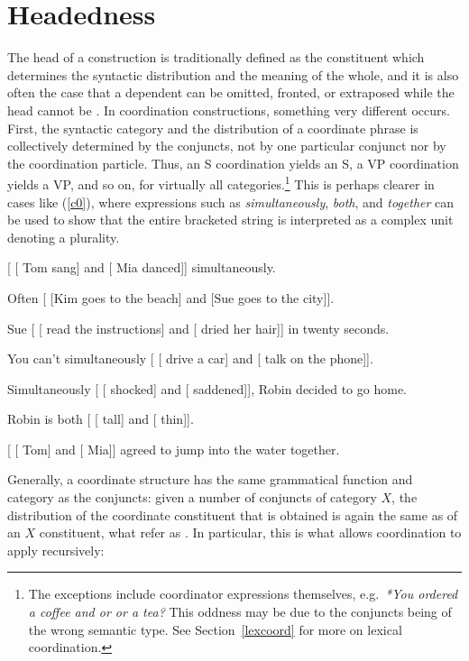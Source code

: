 {\section{Headedness}
\label{coord:sec-headedness}

The head of a construction is traditionally defined as the constituent which determines the syntactic distribution and the meaning of the whole, and it is also often the case that a dependent can be omitted, fronted, or extraposed while the head cannot be \citep{zwicky85}. In coordination constructions, something very different occurs. First, the syntactic category and the distribution of a coordinate phrase is collectively determined by the conjuncts, not by one particular conjunct nor by the coordination particle. Thus, an S coordination yields an S, a VP coordination yields a VP, and so on, for virtually all categories.\footnote{The exceptions include coordinator expressions themselves, e.g.\ \emph{*You ordered a coffee and or or a tea?} This oddness may be due to the conjuncts being of the wrong semantic type. See Section~\ref{lexcoord} for more on lexical coordination.}
This is perhaps clearer in cases like (\ref{c0}), where
expressions such as \emph{simultaneously}, \emph{both}, and
\emph{together} can be used to show that the entire bracketed string
is interpreted as a complex unit denoting a plurality.


\eal
\label{c0}
\ex{} [ [ Tom sang] and [ Mia danced]] simultaneously.

\ex{} Often [ [Kim goes to the beach] and [Sue goes to the city]].

\ex{} Sue [ [ read the instructions] and [ dried her hair]] in twenty seconds.

\ex{} You can't simultaneously [ [ drive a car] and [ talk on the phone]].

\ex{} Simultaneously [ [ shocked] and [ saddened]], Robin decided to go home.

\ex Robin is both [ [ tall] and [ thin]].

\ex{} [ [ Tom] and [ Mia]] agreed to jump into the water together.
\zl


Generally, a coordinate structure has the same grammatical function and category as the conjuncts: given a number of conjuncts of category $X$, the distribution of the coordinate constituent that is obtained is again the same as of an $X$ constituent, what \citet[]{pullumzwicky} refer as .
In particular, this is what allows coordination to apply recursively:

}
